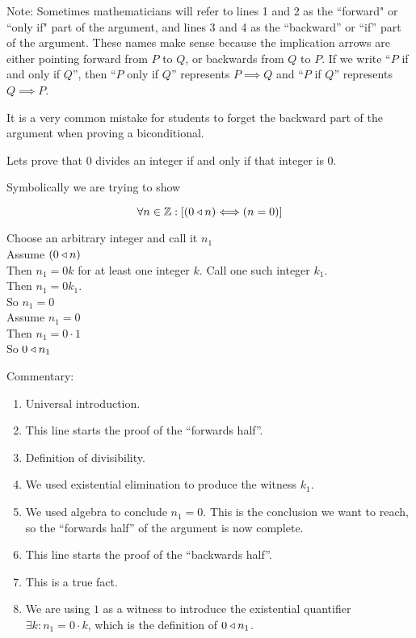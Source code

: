 Note:  Sometimes mathematicians will refer to lines 1 and 2 as the ``forward" or ``only if" part of the argument, and lines 3 and 4 as the ``backward'' or ``if'' part of the argument.  These names make sense because the implication arrows are either pointing forward from $P$ to $Q$, or backwards from $Q$ to $P$.  If we write ``$P$ if and only if $Q$'', then ``$P$ only if $Q$'' represents $P \implies Q$ and ``$P$ if $Q$'' represents $Q \implies P$.

It is a very common mistake for students to forget the backward part of the argument when proving a biconditional. 

\begin{example}
		Lets prove that $0$ divides an integer if and only if that integer is $0$.
		
		Symbolically we are trying to show
		
		\[
		\forall n \in \mathbb{Z}: [ (0 \triangleleft n) \Longleftrightarrow (n=0)]
		\]
		
		\begin{fitch}
				\textrm{Choose an arbitrary integer and call it $n_1$}\\
				\textrm{ Assume $(0 \triangleleft n)$}\\
				\fa \textrm{Then $n_1 = 0k$ for at least one integer $k$.  Call one such integer $k_1$.}\\
				\fa \textrm{Then $n_1= 0k_1$.}\\
				\fa \textrm{So $n_1=0$}\\
				\textrm{Assume $n_1=0$}\\
				\fa \textrm{Then $n_1 = 0 \cdot 1$}\\
				\fa \textrm{So $0 \triangleleft n_1$}
		\end{fitch}
	
	Commentary:
	
	\begin{enumerate}
			\item Universal introduction.
			\item This line starts the proof of the ``forwards half''.
			\item Definition of divisibility.
			\item We used existential elimination to produce the witness $k_1$.
			\item We used algebra to conclude $n_1 = 0$.  This is the conclusion we want to reach, so the ``forwards half'' of the argument is now complete.
			\item This line starts the proof of the ``backwards half''.
			\item This is a true fact.
			\item We are using $1$ as a witness to introduce the existential quantifier $\exists k: n_1 = 0 \cdot k$, which is the definition of $0 \triangleleft n_1$.
		\end{enumerate}
	\end{example}



